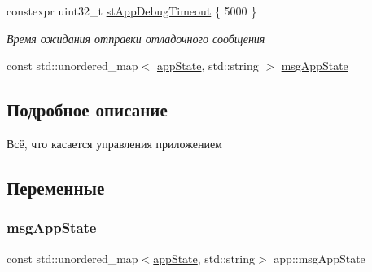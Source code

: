 \begin{DoxyCompactItemize}
constexpr uint32\+\_\+t \hyperlink{namespaceapp_a5d3e2252ee97a72dc9ab825375962ca1}{st\+App\+Debug\+Timeout} \{ 5000 \}
\begin{DoxyCompactList}\small\item\em Время ожидания отправки отладочного сообщения \end{DoxyCompactList}\item 
const std\+::unordered\+\_\+map$<$ \hyperlink{group___xD0_x9F_xD0_xB5_xD1_x80_xD0_xB5_xD1_x87_xD0_xB8_xD1_x81_xD0_xBB_xD0_xB5_xD0_xBD_xD0_xB8_xD1_x8F_ga290e8080c661e52c2f685fd4af148acf}{app\+State}, std\+::string $>$ \hyperlink{namespaceapp_a5731c1034c8fb7eaa43470e10aeff84c}{msg\+App\+State}
\end{DoxyCompactItemize}


\subsection{Подробное описание}
Всё, что касается управления приложением 

\subsection{Переменные}
\mbox{\label{namespaceapp_a5731c1034c8fb7eaa43470e10aeff84c}} 
\subsubsection{\texorpdfstring{msg\+App\+State}{msgAppState}}
{\footnotesize\ttfamily const std\+::unordered\+\_\+map$<$\hyperlink{group___xD0_x9F_xD0_xB5_xD1_x80_xD0_xB5_xD1_x87_xD0_xB8_xD1_x81_xD0_xBB_xD0_xB5_xD0_xBD_xD0_xB8_xD1_x8F_ga290e8080c661e52c2f685fd4af148acf}{app\+State}, std\+::string$>$ app\+::msg\+App\+State}

